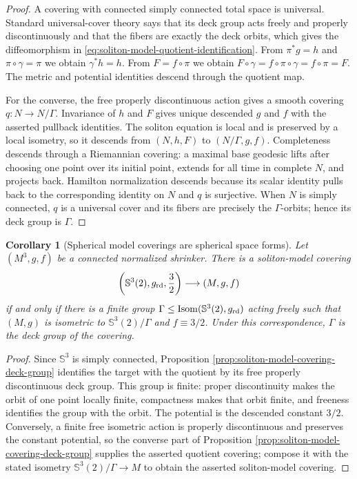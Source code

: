 \documentclass[10pt]{coll-l}
\newcommand{\Isom}{\operatorname{Isom}}
\newcommand{\Sph}{\mathbb{S}}
\newtheorem{corollary}[theorem]{Corollary}
\theoremstyle{definition}
\theoremstyle{remark}
\numberwithin{section}{chapter}
\numberwithin{equation}{chapter}
\begin{document}
\begin{proof}
A covering with connected simply connected total space is universal.
Standard universal-cover theory says that its deck group acts freely and
properly discontinuously and that the fibers are exactly the deck orbits,
which gives the diffeomorphism in
\eqref{eq:soliton-model-quotient-identification}.  From
$\pi^*g=h$ and $\pi\circ\gamma=\pi$ we obtain
$\gamma^*h=h$.  From $F=f\circ\pi$ we obtain
$F\circ\gamma=f\circ\pi\circ\gamma=f\circ\pi=F$.  The metric and
potential identities descend through the quotient map.

For the converse, the free properly discontinuous action gives a smooth
covering $q:N\to N/\Gamma$.  Invariance of $h$ and $F$ gives unique
descended $g$ and $f$ with the asserted pullback identities.  The soliton
equation is local and is preserved by a local isometry, so it descends from
$(N,h,F)$ to $(N/\Gamma,g,f)$.  Completeness descends through a Riemannian
covering: a maximal base geodesic lifts after choosing one point over its
initial point, extends for all time in complete $N$, and projects back.
Hamilton normalization descends because its scalar identity pulls back to
the corresponding identity on $N$ and $q$ is surjective.  When $N$ is
simply connected, $q$ is a universal cover and its fibers are precisely the
$\Gamma$-orbits; hence its deck group is $\Gamma$.
\end{proof}

\begin{corollary}[Spherical model coverings are spherical space forms]
\label{cor:spherical-soliton-cover-space-form}
Let $(M^3,g,f)$ be a connected normalized shrinker.  There is a
soliton-model covering
\begin{equation}
 \left(\Sph^3(2),g_{\rm rd},\frac32\right)
       \longrightarrow(M,g,f)                           \label{eq:spherical-soliton-model-cover}
\end{equation}
if and only if there is a finite group
$\Gamma\leq\Isom(\Sph^3(2),g_{\rm rd})$ acting freely such that
$(M,g)$ is isometric to $\Sph^3(2)/\Gamma$ and $f\equiv3/2$.
Under this correspondence, $\Gamma$ is the deck group of the covering.
\end{corollary}

\begin{proof}
Since $\Sph^3$ is simply connected, Proposition
\ref{prop:soliton-model-covering-deck-group} identifies the target with the
quotient by its free properly discontinuous deck group.  This group is
finite: proper discontinuity makes the orbit of one point locally finite,
compactness makes that orbit finite, and freeness identifies the group with
the orbit.  The potential is
the descended constant $3/2$.  Conversely, a finite free isometric action
is properly discontinuous and preserves the constant potential, so the
converse part of Proposition
\ref{prop:soliton-model-covering-deck-group} supplies the asserted
quotient covering; compose it with the stated isometry
$\Sph^3(2)/\Gamma\to M$ to obtain the asserted soliton-model covering.
\end{proof}
\end{document}
